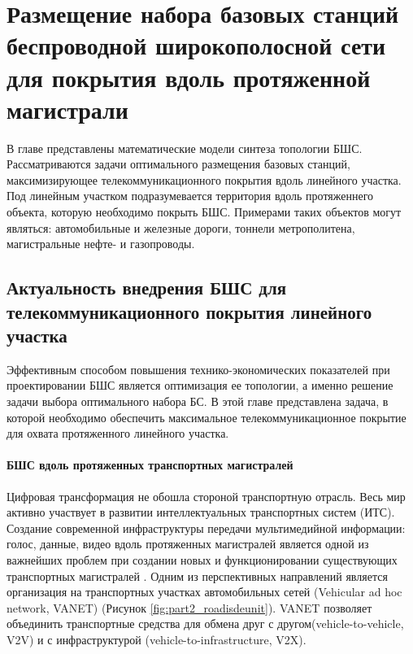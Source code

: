 \chapter{Размещение набора базовых станций беспроводной широкополосной сети для покрытия вдоль протяженной магистрали}\label{chapter_linear_network}

В главе представлены математические модели синтеза топологии БШС. Рассматриваются задачи оптимального размещения базовых станций, максимизирующее телекоммуникационного покрытия вдоль линейного участка. Под линейным участком подразумевается территория вдоль протяженнего объекта, которую необходимо покрыть БШС. Примерами таких объектов могут являться: автомобильные и железные дороги, тоннели метрополитена, магистральные нефте- и газопроводы. 

\section{Актуальность внедрения БШС для телекоммуникационного покрытия линейного участка}


Эффективным способом повышения технико-экономических показателей при проектировании БШС является оптимизация ее топологии, а именно решение задачи выбора оптимального набора БС. В этой главе представлена задача, в  которой необходимо обеспечить максимальное телекоммуникационное покрытие для охвата протяженного линейного 
участка. 

\subsubsection{БШС вдоль протяженных транспортных магистралей}

Цифровая трансформация не обошла стороной транспортную отрасль. Весь мир активно участвует в развитии интеллектуальных транспортных систем (ИТС).  Создание современной инфраструктуры передачи мультимедийной информации: голос, данные, видео вдоль протяженных магистралей является одной из важнейших проблем при создании новых и функционировании существующих транспортных магистралей \cite{Vish2015}. Одним из перспективных направлений  является организация на транспортных участках автомобильных сетей (Vehicular ad hoc network, VANET) \cite{Massobrio2020, Campolo2015, EAKoucheryavy} (Рисунок \cref{fig:part2_roadisdeunit}). VANET позволяет объединить транспортные средства для обмена друг с другом(vehicle-to-vehicle, V2V) и с инфраструктурой (vehicle-to-infrastructure, V2X). 

